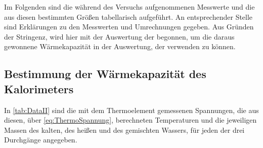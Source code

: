 Im Folgenden sind die während des Versuchs aufgenommenen Messwerte und die 
aus diesen bestimmten Größen tabellarisch aufgeführt. An entsprechender Stelle
sind Erklärungen zu den Messwerten und Umrechnungen gegeben.
Aus Gründen der Stringenz, wird hier mit der Auswertung der 
begonnen, um die daraus gewonnene Wärmekapazität in der Auswertung, der 
verwenden zu können.


\subsection{Bestimmung der Wärmekapazität des Kalorimeters}\label{sec:CM_Kalorimeter}
	In \autoref{tab:DataII} sind die mit dem Thermoelement gemessenen Spannungen, die aus diesen,
	über \eqref{eq:ThermoSpannung}, berechneten Temperaturen und die jeweiligen Massen des kalten,
	des heißen und des gemischten Wassers, für jeden der drei Durchgänge angegeben.
	
